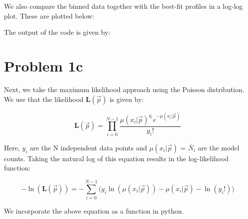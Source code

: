We also compare the binned data together with the best-fit profiles in a log-log plot. These are plotted below:

The output of the code is given by:

%

\section*{Problem 1c}

Next, we take the maximum likelihood approach using the Poisson distribution. We use that the likelihood $\textbf{L}(\vec{p})$ is given by:

\begin{equation}
	\textbf{L}(\vec{p}) = \prod_{i=0}^{N-1} \frac{\mu(x_i | \vec{p})^{y_i} e^{-\mu(x_i | \vec{p})}}{y_i!}
\end{equation}

Here, $y_i$ are the N independent data points and $\mu(x_i | \vec{p})$ = $\bar{N}_i$ are the model counts. Taking the natural log of this equation results in the log-likelihood function:

\begin{equation}
	- \ln(\textbf{L}(\vec{p})) = - \sum_{i=0}^{N-1} \Big( y_i \ln (\mu(x_i | \vec{p})) - \mu(x_i | \vec{p}) - \ln(y_i!) \Big)
\end{equation}	

We incorporate the above equation as a function in python. 